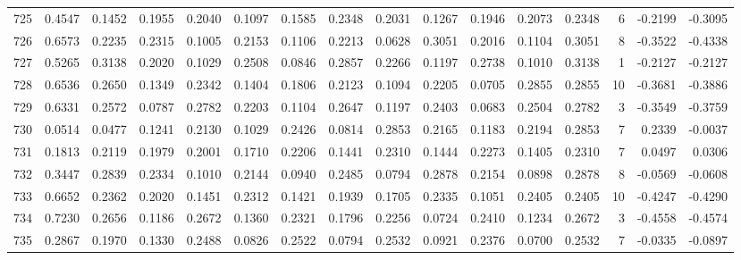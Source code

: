 \begin{tabular}{lrrrrrrrrrrrrrrr}
725 &      0.4547 &  0.1452 &  0.1955 &  0.2040 &  0.1097 &  0.1585 &  0.2348 &  0.2031 &  0.1267 &  0.1946 &   0.2073 &     0.2348 &      6 &                   -0.2199 &                    -0.3095 \\
726 &      0.6573 &  0.2235 &  0.2315 &  0.1005 &  0.2153 &  0.1106 &  0.2213 &  0.0628 &  0.3051 &  0.2016 &   0.1104 &     0.3051 &      8 &                   -0.3522 &                    -0.4338 \\
727 &      0.5265 &  0.3138 &  0.2020 &  0.1029 &  0.2508 &  0.0846 &  0.2857 &  0.2266 &  0.1197 &  0.2738 &   0.1010 &     0.3138 &      1 &                   -0.2127 &                    -0.2127 \\
728 &      0.6536 &  0.2650 &  0.1349 &  0.2342 &  0.1404 &  0.1806 &  0.2123 &  0.1094 &  0.2205 &  0.0705 &   0.2855 &     0.2855 &     10 &                   -0.3681 &                    -0.3886 \\
729 &      0.6331 &  0.2572 &  0.0787 &  0.2782 &  0.2203 &  0.1104 &  0.2647 &  0.1197 &  0.2403 &  0.0683 &   0.2504 &     0.2782 &      3 &                   -0.3549 &                    -0.3759 \\
730 &      0.0514 &  0.0477 &  0.1241 &  0.2130 &  0.1029 &  0.2426 &  0.0814 &  0.2853 &  0.2165 &  0.1183 &   0.2194 &     0.2853 &      7 &                    0.2339 &                    -0.0037 \\
731 &      0.1813 &  0.2119 &  0.1979 &  0.2001 &  0.1710 &  0.2206 &  0.1441 &  0.2310 &  0.1444 &  0.2273 &   0.1405 &     0.2310 &      7 &                    0.0497 &                     0.0306 \\
732 &      0.3447 &  0.2839 &  0.2334 &  0.1010 &  0.2144 &  0.0940 &  0.2485 &  0.0794 &  0.2878 &  0.2154 &   0.0898 &     0.2878 &      8 &                   -0.0569 &                    -0.0608 \\
733 &      0.6652 &  0.2362 &  0.2020 &  0.1451 &  0.2312 &  0.1421 &  0.1939 &  0.1705 &  0.2335 &  0.1051 &   0.2405 &     0.2405 &     10 &                   -0.4247 &                    -0.4290 \\
734 &      0.7230 &  0.2656 &  0.1186 &  0.2672 &  0.1360 &  0.2321 &  0.1796 &  0.2256 &  0.0724 &  0.2410 &   0.1234 &     0.2672 &      3 &                   -0.4558 &                    -0.4574 \\
735 &      0.2867 &  0.1970 &  0.1330 &  0.2488 &  0.0826 &  0.2522 &  0.0794 &  0.2532 &  0.0921 &  0.2376 &   0.0700 &     0.2532 &      7 &                   -0.0335 &                    -0.0897 \\

\end{tabular}
